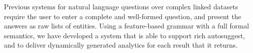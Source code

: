 Previous systems for natural language questions over complex linked datasets require the user to enter a complete and well-formed question, and present the answers as raw lists of entities. Using a feature-based grammar with a full formal semantics, we have developed a system that is able to support rich autosuggest, and to deliver dynamically generated analytics for each result that it returns.

